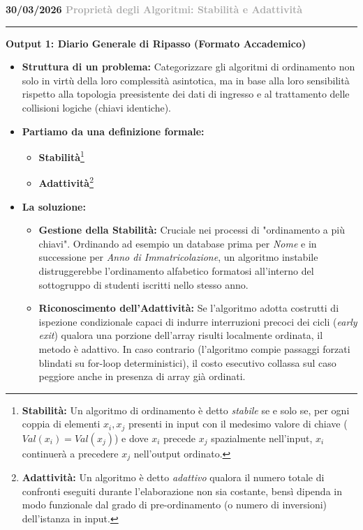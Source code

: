 \documentclass[a4paper, 11pt]{report}
\newcommand{\lezione}[2]{
\vspace{2em}
\noindent\textbf{\Large #1 \hfill \textcolor{darkgray}{#2}}
\vspace{0.5em}
\hrule
\vspace{1.5em}
}
\newcommand{\definizione}[2]{%
\textbf{#1}\footnote{\textbf{#1:} #2}%
}
\begin{document}
\lezione{30/03/2026}{Proprietà degli Algoritmi: Stabilità e Adattività}

\vspace{0.5cm}
\textbf{Output 1: Diario Generale di Ripasso (Formato Accademico)}

\begin{itemize}
    \item \textbf{Struttura di un problema:}
    Categorizzare gli algoritmi di ordinamento non solo in virtù della loro complessità asintotica, ma in base alla loro sensibilità rispetto alla topologia preesistente dei dati di ingresso e al trattamento delle collisioni logiche (chiavi identiche).

    \item \textbf{Partiamo da una definizione formale:}
    \begin{itemize}
        \item \definizione{Stabilità}{Un algoritmo di ordinamento è detto \textit{stabile} se e solo se, per ogni coppia di elementi $x_i, x_j$ presenti in input con il medesimo valore di chiave ($Val(x_i) = Val(x_j)$) e dove $x_i$ precede $x_j$ spazialmente nell'input, $x_i$ continuerà a precedere $x_j$ nell'output ordinato.}
        \item \definizione{Adattività}{Un algoritmo è detto \textit{adattivo} qualora il numero totale di confronti eseguiti durante l'elaborazione non sia costante, bensì dipenda in modo funzionale dal grado di pre-ordinamento (o numero di inversioni) dell'istanza in input.}
    \end{itemize}

    \item \textbf{La soluzione:}
    \begin{itemize}
        \item \textbf{Gestione della Stabilità:} Cruciale nei processi di "ordinamento a più chiavi". Ordinando ad esempio un database prima per \textit{Nome} e in successione per \textit{Anno di Immatricolazione}, un algoritmo instabile distruggerebbe l'ordinamento alfabetico formatosi all'interno del sottogruppo di studenti iscritti nello stesso anno.
        \item \textbf{Riconoscimento dell'Adattività:} Se l'algoritmo adotta costrutti di ispezione condizionale capaci di indurre interruzioni precoci dei cicli (\textit{early exit}) qualora una porzione dell'array risulti localmente ordinata, il metodo è adattivo. In caso contrario (l'algoritmo compie passaggi forzati blindati su for-loop deterministici), il costo esecutivo collassa sul caso peggiore anche in presenza di array già ordinati.
    \end{itemize}
\end{itemize}
\end{document}
